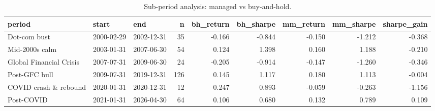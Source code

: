 \begin{table}[htbp]
\centering
\caption{Sub-period analysis: managed vs buy-and-hold.}
\label{tab:subperiods}
\small
\begin{tabular}{lllrrrrrr}
\toprule
period & start & end & n & bh\_return & bh\_sharpe & mm\_return & mm\_sharpe & sharpe\_gain \\
\midrule
Dot-com bust & 2000-02-29 & 2002-12-31 & 35 & -0.166 & -0.844 & -0.150 & -1.212 & -0.368 \\
Mid-2000s calm & 2003-01-31 & 2007-06-30 & 54 & 0.124 & 1.398 & 0.160 & 1.188 & -0.210 \\
Global Financial Crisis & 2007-07-31 & 2009-06-30 & 24 & -0.205 & -0.914 & -0.147 & -1.260 & -0.346 \\
Post-GFC bull & 2009-07-31 & 2019-12-31 & 126 & 0.145 & 1.117 & 0.180 & 1.113 & -0.004 \\
COVID crash \& rebound & 2020-01-31 & 2020-12-31 & 12 & 0.247 & 0.893 & -0.059 & -0.263 & -1.156 \\
Post-COVID & 2021-01-31 & 2026-04-30 & 64 & 0.106 & 0.680 & 0.132 & 0.789 & 0.109 \\
\bottomrule
\end{tabular}
\end{table}

